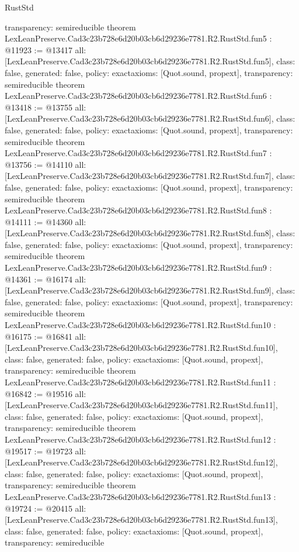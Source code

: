 \begin{lexlean}{RustStd}
\begin{coremodule}
{  transparency: semireducible
}
theorem LexLeanPreserve.Cad3c23b728e6d20b03cb6d29236e7781.R2.RustStd.fun5 : @11923 := @13417 {
  all: [LexLeanPreserve.Cad3c23b728e6d20b03cb6d29236e7781.R2.RustStd.fun5],
  class: false,
  generated: false,
  policy: exact{axioms: [Quot.sound, propext]},
  transparency: semireducible
}
theorem LexLeanPreserve.Cad3c23b728e6d20b03cb6d29236e7781.R2.RustStd.fun6 : @13418 := @13755 {
  all: [LexLeanPreserve.Cad3c23b728e6d20b03cb6d29236e7781.R2.RustStd.fun6],
  class: false,
  generated: false,
  policy: exact{axioms: [Quot.sound, propext]},
  transparency: semireducible
}
theorem LexLeanPreserve.Cad3c23b728e6d20b03cb6d29236e7781.R2.RustStd.fun7 : @13756 := @14110 {
  all: [LexLeanPreserve.Cad3c23b728e6d20b03cb6d29236e7781.R2.RustStd.fun7],
  class: false,
  generated: false,
  policy: exact{axioms: [Quot.sound, propext]},
  transparency: semireducible
}
theorem LexLeanPreserve.Cad3c23b728e6d20b03cb6d29236e7781.R2.RustStd.fun8 : @14111 := @14360 {
  all: [LexLeanPreserve.Cad3c23b728e6d20b03cb6d29236e7781.R2.RustStd.fun8],
  class: false,
  generated: false,
  policy: exact{axioms: [Quot.sound, propext]},
  transparency: semireducible
}
theorem LexLeanPreserve.Cad3c23b728e6d20b03cb6d29236e7781.R2.RustStd.fun9 : @14361 := @16174 {
  all: [LexLeanPreserve.Cad3c23b728e6d20b03cb6d29236e7781.R2.RustStd.fun9],
  class: false,
  generated: false,
  policy: exact{axioms: [Quot.sound, propext]},
  transparency: semireducible
}
theorem LexLeanPreserve.Cad3c23b728e6d20b03cb6d29236e7781.R2.RustStd.fun10 : @16175 := @16841 {
  all: [LexLeanPreserve.Cad3c23b728e6d20b03cb6d29236e7781.R2.RustStd.fun10],
  class: false,
  generated: false,
  policy: exact{axioms: [Quot.sound, propext]},
  transparency: semireducible
}
theorem LexLeanPreserve.Cad3c23b728e6d20b03cb6d29236e7781.R2.RustStd.fun11 : @16842 := @19516 {
  all: [LexLeanPreserve.Cad3c23b728e6d20b03cb6d29236e7781.R2.RustStd.fun11],
  class: false,
  generated: false,
  policy: exact{axioms: [Quot.sound, propext]},
  transparency: semireducible
}
theorem LexLeanPreserve.Cad3c23b728e6d20b03cb6d29236e7781.R2.RustStd.fun12 : @19517 := @19723 {
  all: [LexLeanPreserve.Cad3c23b728e6d20b03cb6d29236e7781.R2.RustStd.fun12],
  class: false,
  generated: false,
  policy: exact{axioms: [Quot.sound, propext]},
  transparency: semireducible
}
theorem LexLeanPreserve.Cad3c23b728e6d20b03cb6d29236e7781.R2.RustStd.fun13 : @19724 := @20415 {
  all: [LexLeanPreserve.Cad3c23b728e6d20b03cb6d29236e7781.R2.RustStd.fun13],
  class: false,
  generated: false,
  policy: exact{axioms: [Quot.sound, propext]},
  transparency: semireducible
}
\end{coremodule}
\end{lexlean}
